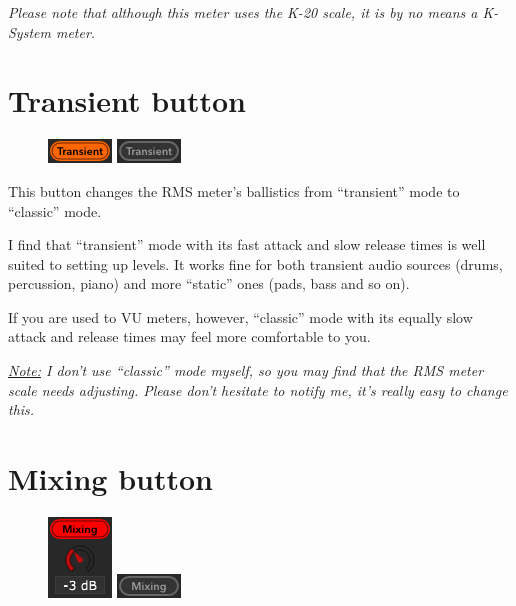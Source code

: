 \emph{Please note that although this meter uses the K-20 scale, it is
  by no means a K-System meter.}

\newpage %

\section{Transient button}
\label{sec:transient_button}

\begin{figure}
\includegraphics[scale=\screenshotscale,clip]{include/images/button_transient_on.png}
\newline \vspace{-0.9\baselineskip}
\includegraphics[scale=\screenshotscale,clip]{include/images/button_transient_off.png}
\end{figure}

This button changes the RMS meter's ballistics from ``transient'' mode
to ``classic'' mode.

I find that ``transient'' mode with its fast attack and slow release
times is well suited to setting up levels.  It works fine for both
transient audio sources (drums, percussion, piano) and more ``static''
ones (pads, bass and so on).

If you are used to VU meters, however, ``classic'' mode with its
equally slow attack and release times may feel more comfortable to
you.

\emph{\underline{Note:} I don't use ``classic'' mode myself, so you
  may find that the RMS meter scale needs adjusting.  Please don't
  hesitate to notify me, it's really easy to change this.}

\section{Mixing button}
\label{sec:mixing_button}

\begin{figure}
\includegraphics[scale=\screenshotscale,clip]{include/images/button_mixing_on.png}
\newline \vspace{-0.9\baselineskip}
\includegraphics[scale=\screenshotscale,clip]{include/images/button_mixing_off.png}
\end{figure}

